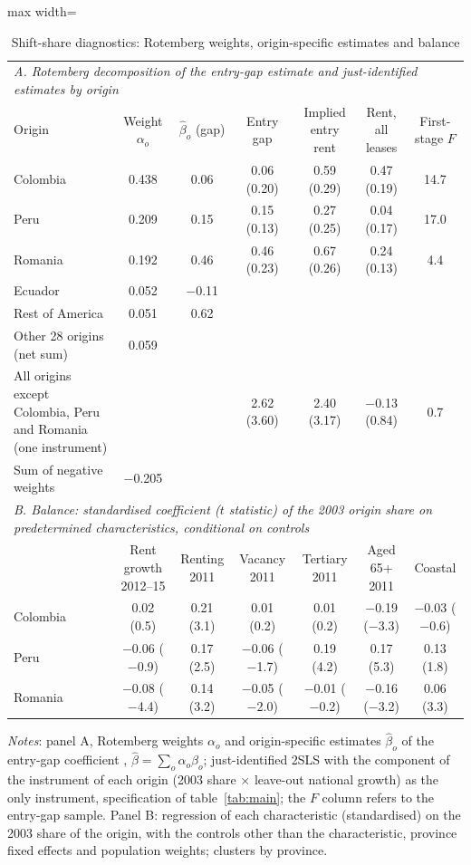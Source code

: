 \begin{table}[!htbp]\centering\small
\caption{Shift-share diagnostics: Rotemberg weights, origin-specific estimates and balance}\label{tab:A1}
\begin{adjustbox}{max width=\linewidth}\begin{tabular}{lcccccc}\toprule
\multicolumn{7}{l}{\textit{A. Rotemberg decomposition of the entry-gap estimate and just-identified estimates by origin}}\\
Origin & Weight $\alpha_o$ & $\hat\beta_o$ (gap) & Entry gap & Implied entry rent & Rent, all leases & First-stage $F$\\\midrule
Colombia & 0.438 & 0.06 & 0.06 (0.20) & 0.59 (0.29) & 0.47 (0.19) & 14.7\\
Peru & 0.209 & 0.15 & 0.15 (0.13) & 0.27 (0.25) & 0.04 (0.17) & 17.0\\
Romania & 0.192 & 0.46 & 0.46 (0.23) & 0.67 (0.26) & 0.24 (0.13) & 4.4\\
Ecuador & 0.052 & $-$0.11 &  & &  & \\
Rest of America & 0.051 & 0.62 &  & &  & \\
Other 28 origins (net sum) & 0.059 & & & & & \\
All origins except Colombia, Peru and Romania (one instrument) & & & 2.62 (3.60) & 2.40 (3.17) & $-$0.13 (0.84) & 0.7\\
Sum of negative weights & $-$0.205 & & & & & \\
\midrule
\multicolumn{7}{l}{\textit{B. Balance: standardised coefficient ($t$ statistic) of the 2003 origin share on predetermined characteristics, conditional on controls}}\\
 & Rent growth 2012--15 & Renting 2011 & Vacancy 2011 & Tertiary 2011 & Aged 65+ 2011 & Coastal\\
Colombia & 0.02 (0.5) & 0.21 (3.1) & 0.01 (0.2) & 0.01 (0.2) & $-$0.19 ($-$3.3) & $-$0.03 ($-$0.6)\\
Peru & $-$0.06 ($-$0.9) & 0.17 (2.5) & $-$0.06 ($-$1.7) & 0.19 (4.2) & 0.17 (5.3) & 0.13 (1.8)\\
Romania & $-$0.08 ($-$4.4) & 0.14 (3.2) & $-$0.05 ($-$2.0) & $-$0.01 ($-$0.2) & $-$0.16 ($-$3.2) & 0.06 (3.3)\\
\bottomrule\end{tabular}\end{adjustbox}
\begin{minipage}{0.97\linewidth}\footnotesize\vspace{4pt}
\textit{Notes}: panel A, Rotemberg weights $\alpha_o$ and origin-specific estimates $\hat\beta_o$ of the entry-gap coefficient \citep{goldsmith2020}, $\hat\beta=\sum_o\alpha_o\hat\beta_o$; just-identified 2SLS with the component of the instrument of each origin (2003 share $\times$ leave-out national growth) as the only instrument, specification of table~\ref{tab:main}; the $F$ column refers to the entry-gap sample. Panel B: regression of each characteristic (standardised) on the 2003 share of the origin, with the controls other than the characteristic, province fixed effects and population weights; clusters by province.
\end{minipage}\end{table}